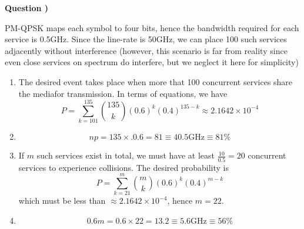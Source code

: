 \documentclass[a4paper]{article}
\newcounter{QuestionNumber}
\newcommand{\Q}{
\textbf{Question \theQuestionNumber)}
\stepcounter{QuestionNumber}
}
\begin{document}
\Q


PM-QPSK maps each symbol to four bits, hence the bandwidth required for each service is 0.5GHz. Since the line-rate is 50GHz, we can place 100 such services adjacently without interference (however, this scenario is far from reality since even close services on spectrum do interfere, but we neglect it here for simplicity)

\begin{enumerate}[label=\alph*-]
\item
The desired event takes place when more that 100 concurrent services share the mediafor transmission. In terms of equations, we have
$$
P=\sum_{k=101}^{135}\binom{135}{k}(0.6)^k(0.4)^{135-k}
\approx 2.1642\times 10^{-4}
$$
\item
$$
np=135\times .0.6=81\equiv 40.5\text{GHz}\equiv 81\%
$$
\item
If $m$ such services exist in total, we must have at least $\frac{10}{0.5}=20$ concurrent services to experience collisions. The desired probability is
$$
P=\sum_{k=21}^m\binom{m}{k}(0.6)^k(0.4)^{m-k}
$$
which must be less than $\approx 2.1642\times 10^{-4}$, hence $m=22$.
\item
$$
0.6m=0.6\times 22= 13.2\equiv 5.6\text{GHz}\equiv 56\%
$$
\end{enumerate}

\end{document}

